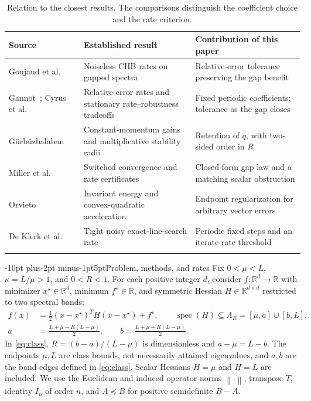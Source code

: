 \documentclass[pdflatex,sn-mathphys-num]{sn-jnl}
\makeatletter
\renewcommand\section{\@startsection{section}{1}{\z@}%
  {-10pt plus-2pt minus-1pt}{5pt}{\sectionfont}}
\theoremstyle{thmstyleone}
\theoremstyle{thmstyletwo}
\newcommand{\R}{\mathbb R}
\newcommand{\spec}{\operatorname{spec}}
\newcommand{\norm}[1]{\left\lVert #1\right\rVert}
\makeatother
\begin{document}
\begin{table}[htbp]
\caption{Relation to the closest results. The comparisons distinguish the
coefficient choice and the rate criterion.}
\label{tab:comparison}
\small
\begin{tabular}{@{}>{\raggedright\arraybackslash}p{}>{\raggedright\arraybackslash}p{}>{\raggedright\arraybackslash}p{}@{}}
\toprule
Source & Established result & Contribution of this paper\\
\midrule
Goujaud et al.~\cite{goujaud2022} & Noiseless CHB rates on gapped spectra & Relative-error tolerance preserving the gap benefit\\[4pt]
Gannot~\cite{gannot2022}; Cyrus et al.~\cite{cyrus2018} & Relative-error rates and stationary rate--robustness tradeoffs & Fixed periodic coefficients; tolerance as the gap closes\\[4pt]
G\"urb\"uzbalaban~\cite{gurbuz2025} & Constant-momentum gains and multiplicative stability radii & Retention of $q$, with two-sided order in $R$\\[4pt]
Miller et al.~\cite[Theorem 4.1]{miller2026} & Switched convergence and rate certificates & Closed-form gap law and a matching scalar obstruction\\[4pt]
Orvieto~\cite[Proposition 4]{orvieto2025} & Invariant energy and convex-quadratic acceleration & Endpoint regularization for arbitrary vector errors\\[4pt]
De Klerk et al.~\cite[Theorem 5.1]{deklerk2017} & Tight noisy exact-line-search rate & Periodic fixed steps and an iterate-rate threshold\\
\botrule
\end{tabular}
\end{table}

\section{Problem, methods, and rates}\label{sec:setting}
Fix $0<\mu<L$, $\kappa=L/\mu>1$, and $0<R<1$.
For each positive integer $d$, consider $f:\R^d\to\R$ with
minimizer $x^\star\in\R^d$, minimum $f^\star\in\R$, and symmetric
Hessian $H\in\R^{d\times d}$ restricted to two spectral bands:
\begin{equation}\label{eq:class}
\begin{split}
 f(x)&=\tfrac12(x-x^\star)^TH(x-x^\star)+f^\star,\qquad
 \spec(H)\subseteq\Lambda_R=[\mu,a]\cup[b,L],\\
 a&=\frac{L+\mu-R(L-\mu)}2,\qquad
 b=\frac{L+\mu+R(L-\mu)}2 .
\end{split}
\end{equation}
In \eqref{eq:class}, $R=(b-a)/(L-\mu)$ is dimensionless and
$a-\mu=L-b$. The endpoints $\mu,L$ are class bounds, not necessarily attained
eigenvalues, and $a,b$ are the band edges defined in \eqref{eq:class}.
Scalar Hessians $H=\mu$ and $H=L$ are included.
We use the Euclidean and induced operator norms $\norm{\cdot}$,
transpose $T$, identity $I_n$ of order $n$, and
$A\preceq B$ for positive semidefinite $B-A$.
\end{document}
